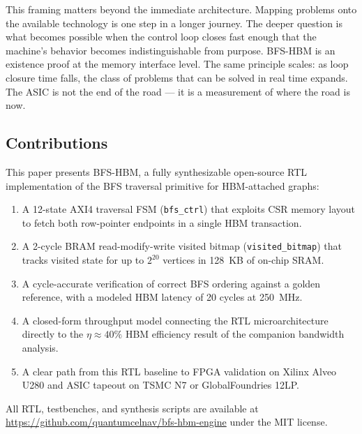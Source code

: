 This framing matters beyond the immediate architecture. Mapping problems onto the
available technology is one step in a longer journey. The deeper question is what
becomes possible when the control loop closes fast enough that the machine's behavior
becomes indistinguishable from purpose. BFS-HBM is an existence proof at the memory
interface level. The same principle scales: as loop closure time falls, the class of
problems that can be solved in real time expands. The ASIC is not the end of the
road --- it is a measurement of where the road is now.

\subsection{Contributions}

This paper presents BFS-HBM, a fully synthesizable open-source RTL implementation of
the BFS traversal primitive for HBM-attached graphs:

\begin{enumerate}[leftmargin=*,itemsep=2pt]
\item A 12-state AXI4 traversal FSM (\texttt{bfs\_ctrl}) that exploits CSR memory
  layout to fetch both row-pointer endpoints in a single HBM transaction.
\item A 2-cycle BRAM read-modify-write visited bitmap (\texttt{visited\_bitmap})
  that tracks visited state for up to $2^{20}$ vertices in 128~KB of on-chip SRAM.
\item A cycle-accurate verification of correct BFS ordering against a golden reference,
  with a modeled HBM latency of 20 cycles at 250~MHz.
\item A closed-form throughput model connecting the RTL microarchitecture directly
  to the $\eta \approx 40\%$ HBM efficiency result of the companion bandwidth analysis.
\item A clear path from this RTL baseline to FPGA validation on Xilinx Alveo U280
  and ASIC tapeout on TSMC N7 or GlobalFoundries 12LP.
\end{enumerate}

All RTL, testbenches, and synthesis scripts are available at
\url{https://github.com/quantumcelnav/bfs-hbm-engine} under the MIT license.

